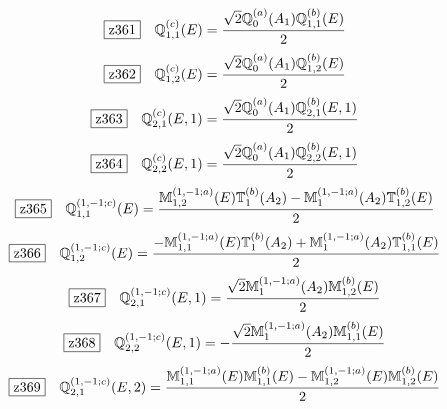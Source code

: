 \documentclass[fleqn,10pt,landscape]{jsarticle}
\begin{document}
\begin{dmath*}
\hspace*{3mm}\fbox{z361}\quad \mathbb{Q}_{1,1}^{(c)}(E)=\frac{\sqrt{2} \mathbb{Q}_{0}^{(a)}(A_{1}) \mathbb{Q}_{1,1}^{(b)}(E)}{2}
\end{dmath*}
\begin{dmath*}
\hspace*{3mm}\fbox{z362}\quad \mathbb{Q}_{1,2}^{(c)}(E)=\frac{\sqrt{2} \mathbb{Q}_{0}^{(a)}(A_{1}) \mathbb{Q}_{1,2}^{(b)}(E)}{2}
\end{dmath*}
\begin{dmath*}
\hspace*{3mm}\fbox{z363}\quad \mathbb{Q}_{2,1}^{(c)}(E,1)=\frac{\sqrt{2} \mathbb{Q}_{0}^{(a)}(A_{1}) \mathbb{Q}_{2,1}^{(b)}(E,1)}{2}
\end{dmath*}
\begin{dmath*}
\hspace*{3mm}\fbox{z364}\quad \mathbb{Q}_{2,2}^{(c)}(E,1)=\frac{\sqrt{2} \mathbb{Q}_{0}^{(a)}(A_{1}) \mathbb{Q}_{2,2}^{(b)}(E,1)}{2}
\end{dmath*}
\begin{dmath*}
\hspace*{3mm}\fbox{z365}\quad \mathbb{Q}_{1,1}^{(1,-1;c)}(E)=\frac{\mathbb{M}_{1,2}^{(1,-1;a)}(E) \mathbb{T}_{1}^{(b)}(A_{2}) - \mathbb{M}_{1}^{(1,-1;a)}(A_{2}) \mathbb{T}_{1,2}^{(b)}(E)}{2}
\end{dmath*}
\begin{dmath*}
\hspace*{3mm}\fbox{z366}\quad \mathbb{Q}_{1,2}^{(1,-1;c)}(E)=\frac{- \mathbb{M}_{1,1}^{(1,-1;a)}(E) \mathbb{T}_{1}^{(b)}(A_{2}) + \mathbb{M}_{1}^{(1,-1;a)}(A_{2}) \mathbb{T}_{1,1}^{(b)}(E)}{2}
\end{dmath*}
\begin{dmath*}
\hspace*{3mm}\fbox{z367}\quad \mathbb{Q}_{2,1}^{(1,-1;c)}(E,1)=\frac{\sqrt{2} \mathbb{M}_{1}^{(1,-1;a)}(A_{2}) \mathbb{M}_{1,2}^{(b)}(E)}{2}
\end{dmath*}
\begin{dmath*}
\hspace*{3mm}\fbox{z368}\quad \mathbb{Q}_{2,2}^{(1,-1;c)}(E,1)=- \frac{\sqrt{2} \mathbb{M}_{1}^{(1,-1;a)}(A_{2}) \mathbb{M}_{1,1}^{(b)}(E)}{2}
\end{dmath*}
\begin{dmath*}
\hspace*{3mm}\fbox{z369}\quad \mathbb{Q}_{2,1}^{(1,-1;c)}(E,2)=\frac{\mathbb{M}_{1,1}^{(1,-1;a)}(E) \mathbb{M}_{1,1}^{(b)}(E) - \mathbb{M}_{1,2}^{(1,-1;a)}(E) \mathbb{M}_{1,2}^{(b)}(E)}{2}
\end{dmath*}
\end{document}
